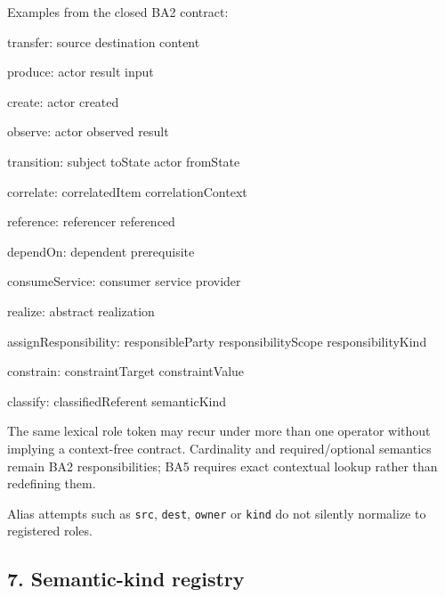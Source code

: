 \documentclass[
  10pt,
  a4paper,
]{article}
\newenvironment{Shaded}{}{}
\newcommand{\NormalTok}[1]{#1}
\begin{document}
Examples from the closed BA2 contract:

\begin{Shaded}
\begin{Highlighting}[]
\NormalTok{transfer:}
\NormalTok{  source}
\NormalTok{  destination}
\NormalTok{  content}

\NormalTok{produce:}
\NormalTok{  actor}
\NormalTok{  result}
\NormalTok{  input}

\NormalTok{create:}
\NormalTok{  actor}
\NormalTok{  created}

\NormalTok{observe:}
\NormalTok{  actor}
\NormalTok{  observed}
\NormalTok{  result}

\NormalTok{transition:}
\NormalTok{  subject}
\NormalTok{  toState}
\NormalTok{  actor}
\NormalTok{  fromState}

\NormalTok{correlate:}
\NormalTok{  correlatedItem}
\NormalTok{  correlationContext}

\NormalTok{reference:}
\NormalTok{  referencer}
\NormalTok{  referenced}

\NormalTok{dependOn:}
\NormalTok{  dependent}
\NormalTok{  prerequisite}

\NormalTok{consumeService:}
\NormalTok{  consumer}
\NormalTok{  service}
\NormalTok{  provider}

\NormalTok{realize:}
\NormalTok{  abstract}
\NormalTok{  realization}

\NormalTok{assignResponsibility:}
\NormalTok{  responsibleParty}
\NormalTok{  responsibilityScope}
\NormalTok{  responsibilityKind}

\NormalTok{constrain:}
\NormalTok{  constraintTarget}
\NormalTok{  constraintValue}

\NormalTok{classify:}
\NormalTok{  classifiedReferent}
\NormalTok{  semanticKind}
\end{Highlighting}
\end{Shaded}

The same lexical role token may recur under more than one operator
without implying a context-free contract. Cardinality and
required/optional semantics remain BA2 responsibilities; BA5 requires
exact contextual lookup rather than redefining them.

Alias attempts such as \texttt{src}, \texttt{dest}, \texttt{owner} or
\texttt{kind} do not silently normalize to registered roles.

\subsection{7. Semantic-kind registry}\label{semantic-kind-registry}
\end{document}
